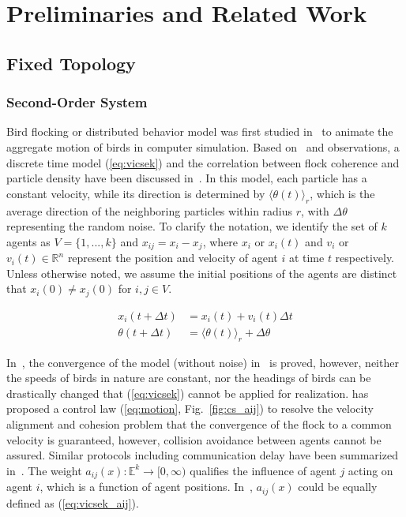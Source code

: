 \chapter{Preliminaries and Related Work}\label{preliminaries}

\section{Fixed Topology}\label{flocking}

\subsection{Second-Order System}

Bird flocking or distributed behavior model was first studied in~\cite{Reynolds1987} to animate the aggregate motion of birds in computer simulation. Based on~\cite{Reynolds1987} and observations, a discrete time model (\ref{eq:vicsek}) and the correlation between flock coherence and particle density have been discussed in~\cite{Vicsek1995}. In this model, each particle has a constant velocity, while its direction is determined by ${\langle\theta(t)\rangle}_r$, which is the average direction of the neighboring particles within radius $r$, with $\Delta\theta$ representing the random noise. To clarify the notation, we identify the set of $k$ agents as $V=\{1,...,k\}$ and $x_{ij}=x_i-x_j$, where $x_i$ or $x_i(t)$ and $v_i$ or $v_i(t)\in\mathbb{R}^n$ represent the position and velocity of agent $i$ at time $t$ respectively. Unless otherwise noted, we assume the initial positions of the agents are distinct that $x_i(0)\neq x_j(0)$ for $i, j\in V$.

\begin{equation}\label{eq:vicsek}
\begin{aligned}
x_i(t+\Delta t)&=x_i(t)+v_i(t)\Delta t\\
\theta(t+\Delta t)&={\langle\theta(t)\rangle}_r+\Delta\theta
\end{aligned}
\end{equation}

In~\cite{Coordination2013}, the convergence of the model (without noise) in~\cite{Vicsek1995} is proved, however, neither the speeds of birds in nature are constant, nor the headings of birds can be drastically changed that (\ref{eq:vicsek}) cannot be applied for realization. \cite{CuckerSmale2007} has proposed a control law (\ref{eq:motion}, Fig.~\ref{fig:cs_aij}) to resolve the velocity alignment and cohesion problem that the convergence of the flock to a common velocity is guaranteed, however, collision avoidance between agents cannot be assured. Similar protocols including communication delay have been summarized in~\cite{moreau2004stability,ren2005consensus}. The weight $a_{ij}(x):\mathbb{E}^k\to[0,\infty)$ qualifies the influence of agent $j$ acting on agent $i$, which is a function of agent positions. In~\cite{Vicsek1995}, $a_{ij}(x)$ could be equally defined as (\ref{eq:vicsek_aij}).

